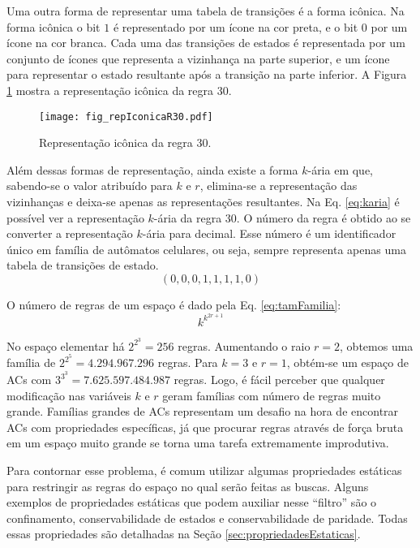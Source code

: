 Uma outra forma de representar uma tabela de transições é a forma icônica. Na forma icônica o bit $1$ é representado por um ícone na cor preta, e o bit $0$ por um ícone na cor branca. Cada uma das transições de estados é representada por um conjunto de ícones que representa a vizinhança na parte superior, e um ícone para representar o estado resultante após a transição na parte inferior. A Figura \ref{fig:repIconicaR30} mostra a representação icônica da regra 30.

	\begin{figure}[h!]
	  \centering
	  \texttt{[image: fig\_repIconicaR30.pdf]}
	  \caption{Representação icônica da regra 30.}
	  \label{fig:repIconicaR30}
	\end{figure}

Além dessas formas de representação, ainda existe a forma $k$-ária em que, sabendo-se o valor atribuído para $k$ e $r$, elimina-se a representação das vizinhanças e deixa-se apenas as representações resultantes. Na Eq. \eqref{eq:karia} é possível ver a representação $k$-ária da regra 30. O número da regra é obtido ao se converter a representação $k$-ária para decimal. Esse número é um identificador único em família de autômatos celulares, ou seja, sempre representa apenas uma tabela de transições de estado.
	\begin{equation}
	(0,0,0,1,1,1,1,0)
	\label{eq:karia}
	\end{equation}

O número de regras de um espaço é dado pela Eq. \eqref{eq:tamFamilia}:%
	\begin{equation}
	k^{k^{2r+1}}
	\label{eq:tamFamilia}
	\end{equation}

No espaço elementar há $2^{2^{3}} = 256$ regras. Aumentando o raio $r=2$, obtemos uma família de $2^{2^{5}} = 4.294.967.296$ regras. Para $k=3$ e $r=1$, obtém-se um espaço de ACs com $3^{3^{3}} = 7.625.597.484.987$ regras. Logo, é fácil perceber que qualquer modificação nas variáveis $k$ e $r$ geram famílias com número de regras muito grande. %
Famílias grandes de ACs representam um desafio na hora de encontrar ACs com propriedades específicas, já que procurar regras através de força bruta em um espaço muito grande se torna uma tarefa extremamente improdutiva. %

Para contornar esse problema, é comum utilizar algumas propriedades estáticas para restringir as regras do espaço no qual serão feitas as buscas. Alguns exemplos de propriedades estáticas que podem auxiliar nesse ``filtro'' são o confinamento, conservabilidade de estados e conservabilidade de paridade. Todas essas propriedades são detalhadas na Seção \ref{sec:propriedadesEstaticas}.

